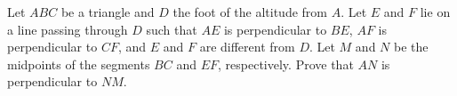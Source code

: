 Let $ABC$ be a triangle and $D$ the foot of the altitude from $A$. Let $E$ and $F$ lie on a line passing through $D$ such that $AE$ is perpendicular to $BE$, $AF$ is perpendicular to $CF$, and $E$ and $F$ are different from $D$. Let $M$ and $N$ be the midpoints of the segments $BC$ and $EF$, respectively. Prove that $AN$ is perpendicular to $NM$.